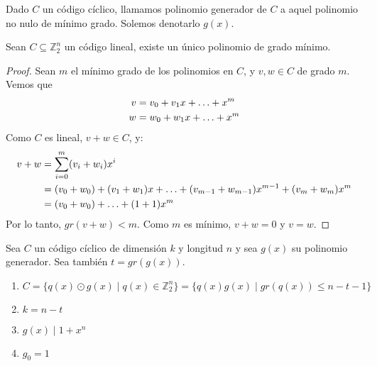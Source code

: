 \begin{definition}
Dado $C$ un código cíclico, llamamos polinomio generador de $C$ a aquel polinomio no nulo de mínimo grado. Solemos denotarlo $g(x)$.
\end{definition}

\begin{proposition}
Sean $C \subseteq{\mathbb{Z}_2^n}$ un código lineal, existe un único polinomio de grado mínimo.
\end{proposition}
\begin{proof}
Sean $m$ el mínimo grado de los polinomios en $C$, y $v, w \in C$ de grado $m$. Vemos que
\begin{align}
    v &= v_0 + v_1 x + \mathellipsis + x^m\\
    w &= w_0 + w_1 x + \mathellipsis + x^m
\end{align}
Como $C$ es lineal, $v+w \in C$, y:
\begin{align}
    v + w &= \sum_{i=0}^m (v_i + w_i) x^i\\
    &= (v_0 + w_0) + (v_1 + w_1) x + \mathellipsis + (v_{m-1} + w_{m-1}) x^{m-1} + (v_m + w_m) x^m\\
    &= (v_0 + w_0) + \mathellipsis + (1 + 1) x^m
\end{align}
Por lo tanto, $gr(v+w) < m$. Como $m$ es mínimo, $v+w = 0$ y $v = w$.
\end{proof}

\begin{theorem}
Sea $C$ un código cíclico de dimensión $k$ y longitud $n$ y sea $g(x)$ su polinomio generador. Sea también $t = gr(g(x))$.
\begin{enumerate}
    \item $C = \{ q(x) \odot g(x) \mid q(x) \in \mathbb{Z}_2^n\} = \{ q(x)g(x) \mid gr(q(x)) \le n - t - 1 \}$
    \item $k = n - t$
    \item $g(x) \mid 1+x^n$
    \item $g_0 = 1$
\end{enumerate}
\end{theorem}

